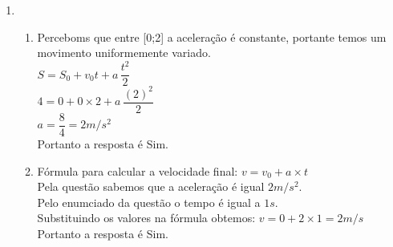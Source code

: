 \documentclass[a4paper, 12pt]{article}
\begin{document}
\begin{enumerate}
\item \begin{enumerate}
	\item Perceboms que entre [0;2] a aceleração é constante, portante temos um movimento uniformemente variado.\\
	
	$S = S_0 + v_0t + a\,\dfrac{t^2}{2}$\\
	$4 = 0 + 0 \times2 + a\,\dfrac{(2)^2}{2}$\\
	$a = \dfrac{8}{4} =  2 m/s^2$\\
	
	Portanto a resposta é Sim.
	
	\item Fórmula para calcular a velocidade final: $v = v_0 + a \times t$ \\
	Pela questão sabemos que a aceleração é igual $2 m/s^2$.\\
	Pelo enumciado da questão o tempo é igual a $1s$.\\
	Substituindo os valores na fórmula obtemos: $v = 0 + 2 \times 1 = 2 m/s$ \\
	
	Portanto a resposta é Sim.

	

\end{enumerate}
	
	 
\end{enumerate}

 
\end{document}

